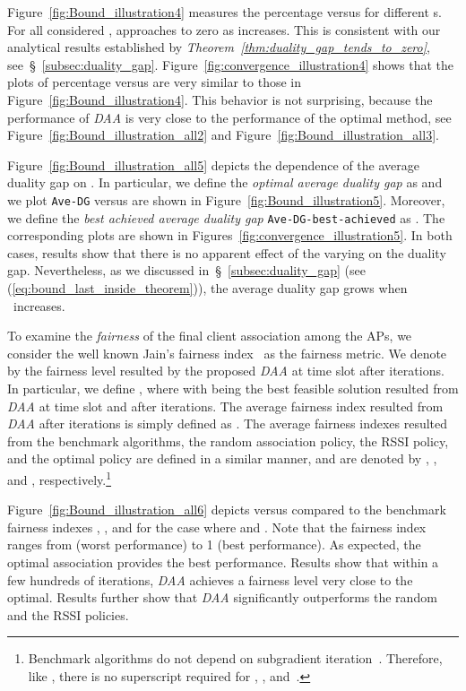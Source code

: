 \documentclass[journal, 10pt, twocolumn]{IEEEtran}
\begin{document}
Figure~\ref{fig:Bound_illustration4} measures the percentage  versus  for different s. For all considered ,  approaches to zero as  increases. This is consistent with our analytical results established by \emph{Theorem~\ref{thm:duality_gap_tends_to_zero}}, see~\S~\ref{subsec:duality_gap}. Figure~\ref{fig:convergence_illustration4} shows that the plots of percentage  versus  are very
similar to those in Figure~\ref{fig:Bound_illustration4}. This behavior is not surprising, because the performance of \emph{DAA} is very close to the performance of the optimal method, see Figure~\ref{fig:Bound_illustration_all2} and Figure~\ref{fig:Bound_illustration_all3}.

Figure~\ref{fig:Bound_illustration_all5} depicts the dependence of the average duality gap on . In particular, we define the \emph{optimal average duality gap} as  and we plot \texttt{Ave-DG} versus  are shown in Figure~\ref{fig:Bound_illustration5}. Moreover, we define the \emph{best achieved average duality gap} \texttt{Ave-DG-best-achieved} as . The corresponding plots are shown in Figures~\ref{fig:convergence_illustration5}. In both cases, results show that there is no apparent effect of the varying  on the duality gap. Nevertheless, as we discussed in~\S~\ref{subsec:duality_gap} (see (\ref{eq:bound_last_inside_theorem})), the average duality gap grows when ~increases.

To examine the \emph{fairness} of the final client association among the APs, we consider the well known Jain's fairness index~\cite{Walrand00} as the fairness metric. We denote by  the fairness level resulted by the proposed \emph{DAA} at time slot  after  iterations. In particular, we define , where  with  being the best feasible solution resulted from \emph{DAA} at time slot  and after  iterations. The average fairness index  resulted from \emph{DAA} after  iterations is simply defined as . The average fairness indexes resulted from the benchmark algorithms, the random association policy, the RSSI policy, and the optimal policy are defined in a similar manner, and are denoted by , , and , respectively.\footnote{Benchmark algorithms do not depend on subgradient iteration~. Therefore, like , there is no superscript  required for , , and~.}

Figure~\ref{fig:Bound_illustration_all6} depicts  versus  compared to the benchmark fairness indexes , , and  for the case where  and . Note that the fairness index ranges from  (worst performance) to 1 (best performance). As expected, the optimal association provides the best performance. Results show that within a few hundreds of iterations, \emph{DAA} achieves a fairness level very close to the optimal. Results further show that \emph{DAA} significantly outperforms the random and the RSSI policies.
\end{document}
